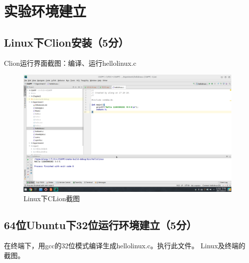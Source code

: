 \section{实验环境建立}
\subsection{Linux下Clion安装（5分）}
Clion运行界面截图：编译、运行hellolinux.c

\begin{figure}[H]
	\centering
	\includegraphics[width=0.55\linewidth]{figures/Linux-Clion}
	\caption{Linux下CLion截图}
	\label{fig:linux-clion}
\end{figure}

\subsection{64位Ubuntu下32位运行环境建立（5分）}

在终端下，用gcc的32位模式编译生成hellolinux.c。执行此文件。
Linux及终端的截图。


